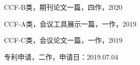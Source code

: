 \begin{resume}

  \begin{publications}
    \item CCF-B类，期刊论文一篇，四作，2020
    \item CCF-A类，会议工具展示一篇，一作，2019
    \item CCF-C类，会议论文一篇，一作，2019
    \item 专利申请，二作，申请日：2019.07.04  
  \end{publications}


\end{resume}

